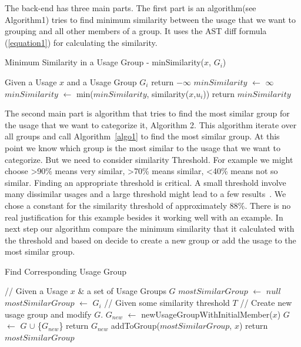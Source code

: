 \documentclass[conference]{IEEEtran}
\begin{document}
The back-end has three main parts. The first part is an algorithm(see Algorithm1) tries to find minimum similarity between the usage that we want to grouping and all other members of a group. It uses the AST diff formula (\ref{equation1}) for calculating the similarity.\par

\begin{algorithm}
\label{algo1}
    \caption{Minimum Similarity in a Usage Group - minSimilarity($x$, $G_{i}$)} 
    \begin{algorithmic}[1]
    \State Given a Usage $x$ and a Usage Group $G_{i}$
    \State return  $-\infty$
    \EndIf
    \State $minSimilarity$ $\leftarrow$ $\infty$
    \State $minSimilarity$ $\leftarrow$ min($minSimilarity$, similarity($x$,$u_{i}$))
    \EndFor
    \State return $minSimilarity$
    \end{algorithmic} 
\end{algorithm}

The second main part is algorithm that tries to find the most similar group for the usage that we want to categorize it, Algorithm 2. This algorithm iterate over all groups and call Algorithm~\ref{algo1} to find the most similar group. At this point we know which group is the most similar to the usage that we want to categorize. But we need to consider similarity Threshold. For example we might choose \textgreater 90\% means very similar, \textgreater 70\% means similar, \textless 40\% means not so similar. Finding an appropriate threshold is critical. A small threshold involve many dissimilar usages and a large threshold might lead to a few results~\cite{deng2013top}. We chose a constant for the similarity threshold of approximately 88\%. There is no real justification for this example besides it working well with an example. In next step our algorithm compare the minimum similarity that it calculated with the threshold and based on decide to create a new group or add the usage to the most similar group. 

\begin{algorithm}
\label{algo2}
    \caption{Find Corresponding Usage Group} 
    \begin{algorithmic}[1]
    \State // Given a Usage $x$ \& a set of Usage Groups $G$
    \State $mostSimilarGroup$ $\leftarrow$ $null$
    \State $mostSimilarGroup$ $\leftarrow$ $G_{i}$
    \EndIf
    \EndFor
    \State // Given some similarity threshold $T$
        \State // Create new usage group and modify $G$.
        \State $G_{new}$ $\leftarrow$ newUsageGroupWithInitialMember($x$)
        \State $G$ $\leftarrow$ $G$ $\cup$ \{$G_{new}$\}
        \State return $G_{new}$
    \EndIf
    \State addToGroup($mostSimilarGroup$, $x$)
    \State return $mostSimilarGroup$
    \end{algorithmic} 
\end{algorithm}
\end{document}
